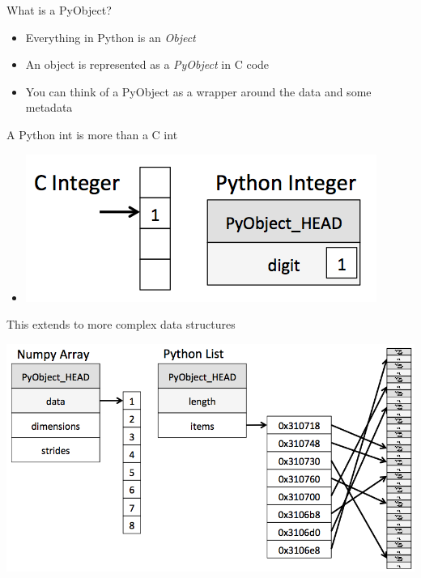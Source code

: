 \documentclass[12pt, aspectration=169]{beamer}
\begin{document}
    \begin{frame}{What is a PyObject?}
        \begin{itemize}
            \item Everything in Python is an \textit{Object}
            \item An object is represented as a \textit{PyObject} in C code
            \item You can think of a PyObject as a wrapper around the data and some metadata
        \end{itemize}
    \end{frame}

    \begin{frame}{A Python int is more than a C int}
        \begin{itemize}
            \item[] \begin{center}
                  \includegraphics[scale=0.5]{static/images/cint_vs_pyint}
            \end{center}
        \end{itemize}
    \end{frame}

    \begin{frame}{This extends to more complex data structures}
        \begin{center}
              \includegraphics[scale=0.25]{static/images/array_vs_list}
        \end{center}
    \end{frame}
\end{document}
